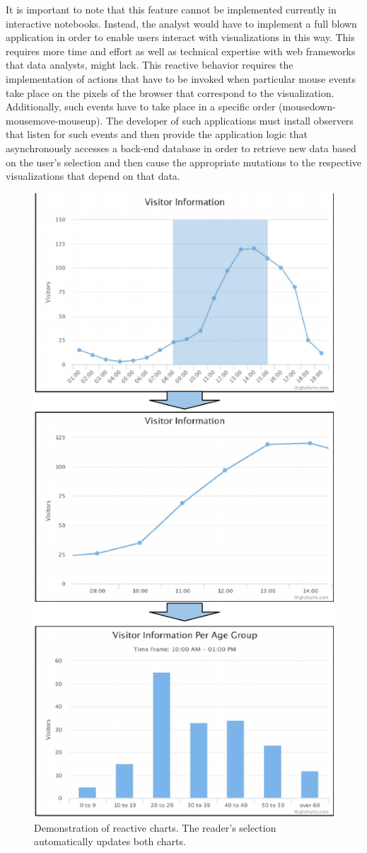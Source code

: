 It is important to note that this feature cannot be implemented currently in interactive notebooks. Instead, the analyst would have to implement a full blown application in order to enable users interact with visualizations in this way. This requires more time and effort as well as technical expertise with web frameworks that data analysts, might lack. This reactive behavior requires the implementation of actions that have to be invoked when particular mouse events take place on the pixels of the browser that correspond to the visualization. Additionally, such events have to take place in a specific order (mousedown-mousemove-mouseup). The developer of such applications must install observers that listen for such events and then provide the application logic that asynchronously accesses a back-end database in order to retrieve new data based on the user's selection and then cause the appropriate mutations to the respective visualizations that depend on that data.
\begin{figure}[]
\centering
	\includegraphics[width=0.7\columnwidth]{figures/reactive-processing.pdf}
	\caption{Demonstration of reactive charts. The reader's selection automatically updates both charts.}
	\label{fig:reactive-data-processing}
\end{figure}


